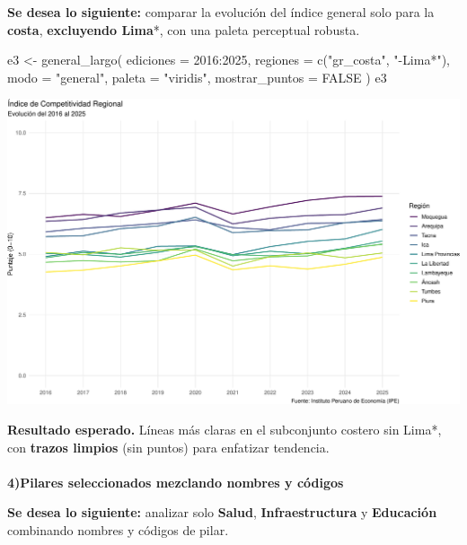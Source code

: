 \documentclass[
  11pt,
  letterpaper,
  DIV=11,
  numbers=noendperiod]{scrartcl}
\makeatletter
\let\oldparagraph\paragraph
\renewcommand{\paragraph}{
    \@ifstar
      \xxxParagraphStar
      \xxxParagraphNoStar
  }
\newcommand{\xxxParagraphStar}[1]{\oldparagraph*{#1}\mbox{}}
\newcommand{\xxxParagraphNoStar}[1]{\oldparagraph{#1}\mbox{}}
\newenvironment{Shaded}{\begin{snugshade}}{\end{snugshade}}
\newcommand{\AttributeTok}[1]{\textcolor[rgb]{0.40,0.45,0.13}{#1}}
\newcommand{\ConstantTok}[1]{\textcolor[rgb]{0.56,0.35,0.01}{#1}}
\newcommand{\DecValTok}[1]{\textcolor[rgb]{0.68,0.00,0.00}{#1}}
\newcommand{\FunctionTok}[1]{\textcolor[rgb]{0.28,0.35,0.67}{#1}}
\newcommand{\NormalTok}[1]{\textcolor[rgb]{0.00,0.23,0.31}{#1}}
\newcommand{\OtherTok}[1]{\textcolor[rgb]{0.00,0.23,0.31}{#1}}
\newcommand{\SpecialCharTok}[1]{\textcolor[rgb]{0.37,0.37,0.37}{#1}}
\newcommand{\StringTok}[1]{\textcolor[rgb]{0.13,0.47,0.30}{#1}}
\makeatother
\begin{document}
\textbf{Se desea lo siguiente:} comparar la evolución del índice general
solo para la \textbf{costa}, \textbf{excluyendo Lima}*, con una paleta
perceptual robusta.

\begin{Shaded}
\begin{Highlighting}[]
\NormalTok{e3 }\OtherTok{\textless{}{-}} \FunctionTok{general\_largo}\NormalTok{(}
  \AttributeTok{ediciones =} \DecValTok{2016}\SpecialCharTok{:}\DecValTok{2025}\NormalTok{,}
  \AttributeTok{regiones  =} \FunctionTok{c}\NormalTok{(}\StringTok{"gr\_costa"}\NormalTok{, }\StringTok{"{-}Lima*"}\NormalTok{),}
  \AttributeTok{modo      =} \StringTok{"general"}\NormalTok{,}
  \AttributeTok{paleta    =} \StringTok{"viridis"}\NormalTok{,}
  \AttributeTok{mostrar\_puntos =} \ConstantTok{FALSE}
\NormalTok{)}
\NormalTok{e3}
\end{Highlighting}
\end{Shaded}

\includegraphics{Manual_files/figure-pdf/unnamed-chunk-38-1.pdf}

\textbf{Resultado esperado.} Líneas más claras en el subconjunto costero
sin Lima*, con \textbf{trazos limpios} (sin puntos) para enfatizar
tendencia.

\paragraph{\texorpdfstring{\textbf{4)Pilares seleccionados mezclando
nombres y
códigos}}{4)Pilares seleccionados mezclando nombres y códigos}}\label{pilares-seleccionados-mezclando-nombres-y-cuxf3digos}

\textbf{Se desea lo siguiente:} analizar solo \textbf{Salud},
\textbf{Infraestructura} y \textbf{Educación} combinando nombres y
códigos de pilar.
\end{document}
